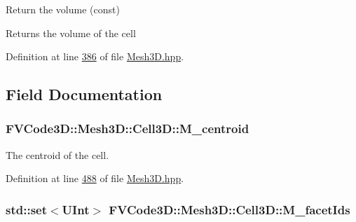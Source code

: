 Return the volume (const) 

\begin{DoxyReturn}{Returns}
the volume of the cell 
\end{DoxyReturn}


Definition at line \hyperlink{Mesh3D_8hpp_source_l00386}{386} of file \hyperlink{Mesh3D_8hpp_source}{Mesh3\+D.\+hpp}.



\subsection{Field Documentation}
\subsubsection[{\texorpdfstring{M\+\_\+centroid}{M_centroid}}]{ F\+V\+Code3\+D\+::\+Mesh3\+D\+::\+Cell3\+D\+::\+M\+\_\+centroid\hspace{0.3cm}{\ttfamily [private]}}\hypertarget{classFVCode3D_1_1Mesh3D_1_1Cell3D_a85077932a074f0903d085f9d33a13e09}{}\label{classFVCode3D_1_1Mesh3D_1_1Cell3D_a85077932a074f0903d085f9d33a13e09}


The centroid of the cell. 



Definition at line \hyperlink{Mesh3D_8hpp_source_l00488}{488} of file \hyperlink{Mesh3D_8hpp_source}{Mesh3\+D.\+hpp}.

\subsubsection[{\texorpdfstring{M\+\_\+facet\+Ids}{M_facetIds}}]{\setlength{\rightskip}{0pt plus 5cm}std\+::set$<${\bf U\+Int}$>$ F\+V\+Code3\+D\+::\+Mesh3\+D\+::\+Cell3\+D\+::\+M\+\_\+facet\+Ids\hspace{0.3cm}{\ttfamily [private]}}\hypertarget{classFVCode3D_1_1Mesh3D_1_1Cell3D_a1aa6b2a5119a2b94946f9a7dcfcb9478}{}\label{classFVCode3D_1_1Mesh3D_1_1Cell3D_a1aa6b2a5119a2b94946f9a7dcfcb9478}


